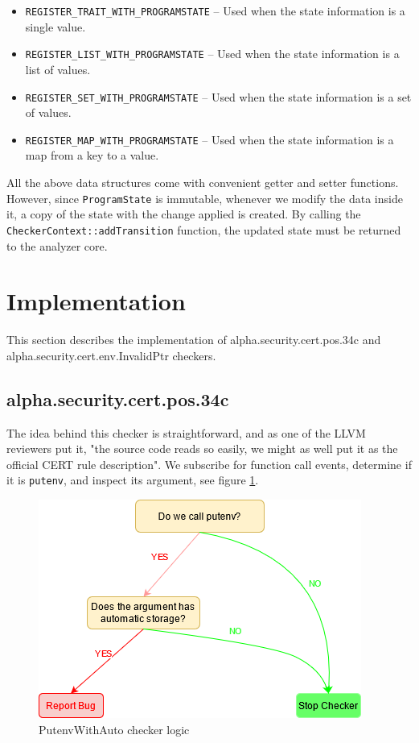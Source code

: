 \begin{itemize}
    \item \lstinline{REGISTER_TRAIT_WITH_PROGRAMSTATE} -- Used when the state information is a single value.
    \item \lstinline{REGISTER_LIST_WITH_PROGRAMSTATE} -- Used when the state information is a list of values.
    \item \lstinline{REGISTER_SET_WITH_PROGRAMSTATE} -- Used when the state information is a set of values.
    \item \lstinline{REGISTER_MAP_WITH_PROGRAMSTATE} -- Used when the state information is a map from a key to a value.
\end{itemize}

All the above data structures come with convenient getter and setter functions. However, since \lstinline{ProgramState} is immutable, whenever we modify the data inside it, a copy of the state with the change applied is created. By calling the \lstinline{CheckerContext::addTransition} function, the updated state must be returned to the analyzer core. 

\section{Implementation}
This section describes the implementation of alpha.security.cert.pos.34c and alpha.security.cert.env.InvalidPtr checkers. 

\subsection{alpha.security.cert.pos.34c} \label{putenv}

The idea behind this checker is straightforward, and as one of the LLVM reviewers put it, "the source code reads so easily, we might as well put it as the official CERT rule description".
We subscribe for function call events, determine if it is \lstinline{putenv}, and inspect its argument, see figure \ref{fig:putenv-diag}.


\begin{figure}[H]
	\centering
	\includegraphics[]{images/putenv_diagram.png}
	\caption{PutenvWithAuto checker logic}
	\label{fig:putenv-diag}
\end{figure}

